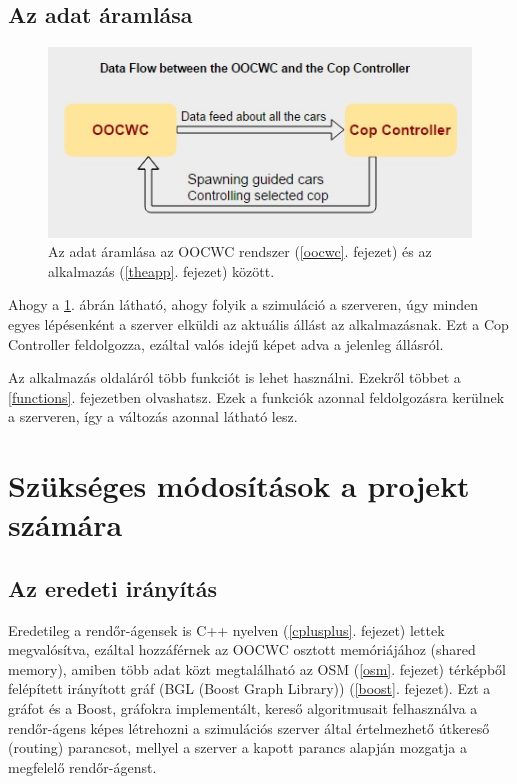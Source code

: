 \documentclass[a4paper,12pt]{report}
\begin{document}
\subsection{Az adat áramlása}
\label{dataflow}

\begin{figure}[ht]
\centerline{
\includegraphics[width=4.5in]{img/dataflow}}
\caption{Az adat áramlása az OOCWC rendszer (\ref{oocwc}. fejezet) és az alkalmazás (\ref{theapp}. fejezet) között.}
\label{dataflowpicture}
\end{figure}

Ahogy a \ref{dataflowpicture}. ábrán látható, ahogy folyik a szimuláció a szerveren, úgy minden egyes lépésenként a szerver elküldi az aktuális állást az alkalmazásnak. Ezt a Cop Controller feldolgozza, ezáltal valós idejű képet adva a jelenleg állásról.

\vspace{2mm}
Az alkalmazás oldaláról több funkciót is lehet használni. Ezekről többet a \ref{functions}. fejezetben olvashatsz. Ezek a funkciók azonnal feldolgozásra kerülnek a szerveren, így a változás azonnal látható lesz.

\section{Szükséges módosítások a projekt számára}
\label{changes}

\subsection{Az eredeti irányítás}
\label{originalrouting}

Eredetileg a rendőr-ágensek is C++ nyelven (\ref{cplusplus}. fejezet) lettek megvalósítva, ezáltal hozzáférnek az OOCWC osztott memóriájához (shared memory), amiben több adat közt megtalálható az OSM \citep{osm} (\ref{osm}. fejezet) térképből felépített irányított gráf (BGL (Boost Graph Library)) (\ref{boost}. fejezet). Ezt a gráfot és a Boost, gráfokra implementált, kereső algoritmusait felhasználva a rendőr-ágens képes létrehozni a szimulációs szerver által értelmezhető útkereső (routing) parancsot, mellyel a szerver a kapott parancs alapján mozgatja a megfelelő rendőr-ágenst. 
\end{document}
